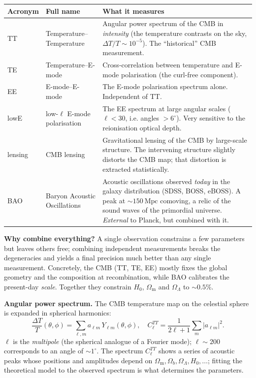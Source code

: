 \documentclass[11pt,a4paper,openany]{report}
\newcommand{\Mpc}{\text{Mpc}}
\newcommand{\Hzero}{H_{0}}
\newcommand{\Om}{\Omega_{\mathrm{m}}}
\newcommand{\OL}{\Omega_{\Lambda}}
\begin{document}
\begin{center}
\renewcommand{\arraystretch}{1.3}
\begin{tabular}{ll p{8.7cm}}
\toprule
\textbf{Acronym} & \textbf{Full name} & \textbf{What it measures} \\
\midrule
TT & Temperature--Temperature & Angular power spectrum of the CMB in
    \emph{intensity} (the temperature contrasts on the sky,
    $\Delta T/T \sim 10^{-5}$). The “historical” CMB measurement. \\
TE & Temperature--E-mode & Cross-correlation between temperature and E-mode
    polarisation (the curl-free component). \\
EE & E-mode--E-mode & The E-mode polarisation spectrum alone. Independent
    of TT. \\
lowE & low-$\ell$ E-mode polarisation & The EE spectrum at large angular
    scales ($\ell < 30$, i.e. angles $> 6^{\circ}$). Very sensitive to the
    reionisation optical depth. \\
lensing & CMB lensing & Gravitational lensing of the CMB by large-scale
    structure. The intervening structure slightly distorts the CMB map; that
    distortion is extracted statistically. \\
BAO & Baryon Acoustic Oscillations & Acoustic oscillations observed
    \emph{today} in the galaxy distribution (SDSS, BOSS, eBOSS). A peak at
    $\sim 150~\Mpc$ comoving, a relic of the sound waves of the primordial
    universe. \emph{External} to Planck, but combined with it. \\
\bottomrule
\end{tabular}
\end{center}

\begin{tcolorbox}[plain]
\textbf{Why combine everything?} A single observation constrains a few
parameters but leaves others free; combining independent measurements breaks
the degeneracies and yields a final precision much better than any single
measurement. Concretely, the CMB (TT, TE, EE) mostly fixes the global geometry
and the composition at recombination, while BAO calibrates the present-day
\emph{scale}. Together they constrain $\Hzero$, $\Om$ and $\OL$ to
$\sim 0.5\%$.
\end{tcolorbox}

\begin{tcolorbox}[undergrad]
\textbf{Angular power spectrum.} The CMB temperature map on the celestial
sphere is expanded in spherical harmonics:
\[
\frac{\Delta T}{T}(\theta,\phi) = \sum_{\ell,m} a_{\ell m}\,Y_{\ell m}(\theta,\phi),
\quad C_{\ell}^{TT} = \frac{1}{2\ell+1}\sum_m |a_{\ell m}|^{2}.
\]
$\ell$ is the \emph{multipole} (the spherical analogue of a Fourier mode);
$\ell\sim 200$ corresponds to an angle of $\sim 1^{\circ}$. The spectrum
$C_{\ell}^{TT}$ shows a series of acoustic peaks whose positions and amplitudes
depend on $\Om, \Omega_b, \OL, \Hzero, \ldots$; fitting the theoretical model to
the observed spectrum is what determines the parameters.
\end{tcolorbox}
\end{document}
